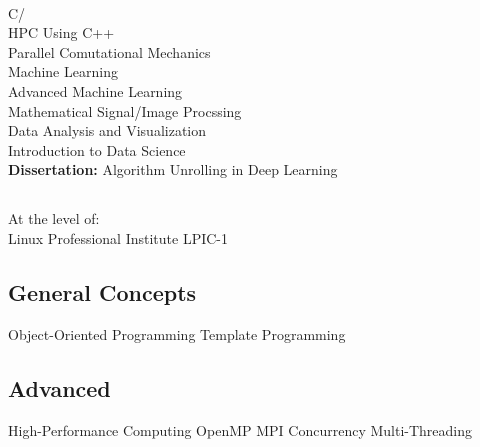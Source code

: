 \documentclass[a4paper]{MagicalCV}
\begin{document}
\begin{minipage}[t]{0.33\textwidth}
\\
C\slash \\
HPC Using C++\\
Parallel Comutational Mechanics\\
Machine Learning\\
Advanced Machine Learning\\
Mathematical Signal/Image Procssing\\
Data Analysis and Visualization\\
Introduction to Data Science\\




\textbf{Dissertation: }
Algorithm Unrolling in Deep Learning
\sectionsep


\subsection{}
At the level of:\\Linux Professional Institute LPIC-1  
\sectionsep


\subsection{General Concepts}
Object-Oriented Programming \textbullet{} Template Programming \textbullet{}  
\sectionsep
\subsection{Advanced}
High-Performance Computing \textbullet{} \textbullet{} OpenMP \textbullet{} MPI \textbullet{} Concurrency \textbullet{} Multi-Threading \textbullet{}
\sectionsep



\end{minipage}
\end{document}
